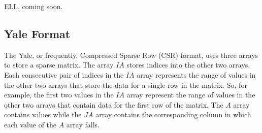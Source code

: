 \documentclass[11pt,conference]{IEEEtran}
\begin{document}
ELL, coming soon.

\subsection{Yale Format}

The Yale, or frequently, Compressed Sparse Row (CSR) format, uses three arrays to store a sparse matrix.  The array $IA$ stores indices into the other two arrays.  Each consecutive pair of indices in the $IA$ array represents the range of values in the other two arrays that store the data for a single row in the matrix.  So, for example, the first two values in the $IA$ array represent the range of values in the other two arrays that contain data for the first row of the matrix.  The $A$ array contains values while the $JA$ array contains the corresponding column in which each value of the $A$ array falls.
\end{document}
